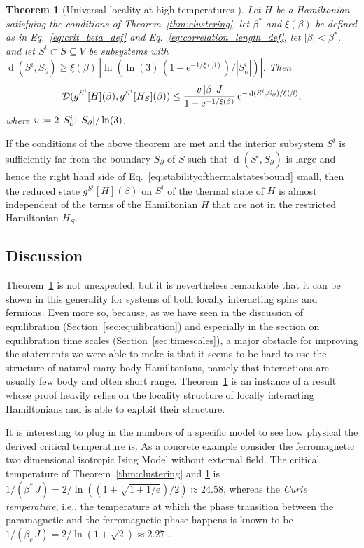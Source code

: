 \documentclass[a4paper,12pt,listof=totoc,index=totoc,bibliography=totoc,headsepline=false,headings=normal,BCOR16.153846mm,DIV12,headinclude,twoside,cleardoublepage=empty,numbers=noenddot,final]{scrreprt}
\theoremstyle{mystyle}
\numberwithin{equation}{section}
\numberwithin{figure}{section}
\numberwithin{lemma}{section}
\newtheorem{theorem}{Theorem}
\numberwithin{theorem}{section}
\numberwithin{corollary}{section}
\numberwithin{definition}{section}
\numberwithin{conjecture}{section}
\numberwithin{observation}{section}
\newcommand{\+}{\mkern2mu}
\newcommand{\coloneqq}{\mathrel{\vcentcolon\mkern-1.2mu=}} %
\newcommand{\texteqref}[1]{Eq.~\eqref{#1}}
\renewcommand{\H}{H}
\newcommand{\rhog}{g}
\newcommand{\tracedistance}[3][]{
  \ifthenelse{\equal{#2}{}}
  {\ifthenelse{\equal{#3}{}}
    {\mathcal{D}_{#1}}{}
  }{
    \ifthenelse{\equal{#1}{}}
    {\operatorname{\mathcal{D}}(#2,#3)}
    {\operatorname{\mathcal{D}}_{#1}(#2,#3)}
  }
}
\newcommand{\e}{\mathrm{e}}
\DeclareMathOperator{\1}{\mathds{1}}
\DeclareMathOperator{\dist}{d}
\begin{document}
\begin{theorem}[Universal locality at high temperatures {\cite[Theorem~4 and 17]{Kliesch2013a}}]\label{thm:intensivity}
  Let $\H$ be a Hamiltonian satisfying the conditions of Theorem~\ref{thm:clustering},
  let $\beta^\ast$ and $\xi(\beta)$ be defined as in \texteqref{eq:crit_beta_def} and \texteqref{eq:correlation_length_def},
  let $|\beta|< \beta^\ast$, and let $S^i \subset S \subseteq V$ be subsystems with 
  $\dist(S^i, S_\partial) \geq \xi(\beta)\, \left|\ln\left(\ln(3)\, (1-\e^{-1/\xi(\beta)})/|S^i_\partial|\right)\right|$.
  Then
  \begin{equation}\label{eq:stabilityofthermalstatesbound}
    \tracedistance{\rhog^{S^i}[\H](\beta)}{\rhog^{S^i}[H_S](\beta)} \leq \frac{ v\, |\beta|\, J }{1-\e^{-1/\xi(\beta)}}\,\e^{- \dist(S^i, S_\partial) /\xi(\beta)} ,
  \end{equation}
  where $v \coloneqq 2\, |S^i_\partial|\,|S_\partial|/\ln(3)$.
\end{theorem}

If the conditions of the above theorem are met and the interior subsystem $S^i$ is sufficiently far from the boundary $S_\partial$ of $S$ such that $\dist(S^i, S_\partial)$ is large and hence the right hand side of \texteqref{eq:stabilityofthermalstatesbound} small, then the reduced state $\rhog^{S^i}[\H](\beta)$ on $S^i$ of the thermal state of $\H$ is almost independent of the terms of the Hamiltonian $\H$ that are not in the restricted Hamiltonian $\H_S$.


\subsection*{Discussion}
%
Theorem~\ref{thm:intensivity} is not unexpected, but it is nevertheless remarkable that it can be shown in this generality for systems of both locally interacting spins and fermions.
Even more so, because, as we have seen in the discussion of equilibration (Section~\ref{sec:equilibration}) and especially in the section on equilibration time scales (Section~\ref{sec:timescales}), a major obstacle for improving the statements we were able to make is that it seems to be hard to use the structure of natural many body Hamiltonians, namely that interactions are usually few body and often short range.
Theorem~\ref{thm:intensivity} is an instance of a result whose proof heavily relies on the locality structure of locally interacting Hamiltonians and is able to exploit their structure.

It is interesting to plug in the numbers of a specific model to see how physical the derived critical temperature is.
As a concrete example consider the ferromagnetic two dimensional isotropic Ising Model without external field.
The critical temperature of Theorem~\ref{thm:clustering} and \ref{thm:intensivity} is 
$1/(\beta^\ast\,J) = 2/\ln((1+\sqrt{1+1/\e})/2) \approx 24.58$, whereas the \emph{Curie temperature}, i.e., the temperature at which the phase transition between the paramagnetic and the ferromagnetic phase happens is known to be
$1/(\beta_c\,J) = 2/\ln(1+\sqrt{2}) \approx 2.27$ \cite{Bhattacharjee1995}.
\end{document}
